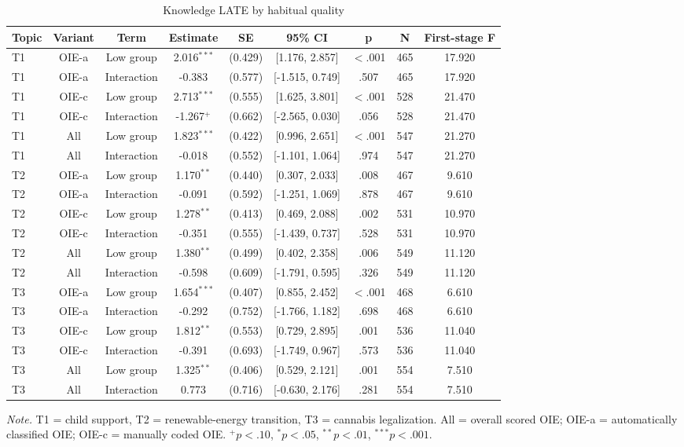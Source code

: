 \begin{table}[htbp]
\centering
\begin{threeparttable}
\caption{Knowledge LATE by habitual quality}
\label{tab:tab_knowledge_moderation}
\begin{tabular}{lcccccccc}
\toprule
  Topic & Variant & Term & Estimate & SE & 95\% CI & p & N & First-stage F \\
\midrule
  T1 & OIE-a & Low group & 2.016$^{***}$ & (0.429) & [1.176, 2.857] & $<$.001 & 465 & 17.920 \\
  T1 & OIE-a & Interaction & -0.383 & (0.577) & [-1.515, 0.749] & .507 & 465 & 17.920 \\
  T1 & OIE-c & Low group & 2.713$^{***}$ & (0.555) & [1.625, 3.801] & $<$.001 & 528 & 21.470 \\
  T1 & OIE-c & Interaction & -1.267$^{+}$ & (0.662) & [-2.565, 0.030] & .056 & 528 & 21.470 \\
  T1 & All & Low group & 1.823$^{***}$ & (0.422) & [0.996, 2.651] & $<$.001 & 547 & 21.270 \\
  T1 & All & Interaction & -0.018 & (0.552) & [-1.101, 1.064] & .974 & 547 & 21.270 \\
  T2 & OIE-a & Low group & 1.170$^{**}$ & (0.440) & [0.307, 2.033] & .008 & 467 & 9.610 \\
  T2 & OIE-a & Interaction & -0.091 & (0.592) & [-1.251, 1.069] & .878 & 467 & 9.610 \\
  T2 & OIE-c & Low group & 1.278$^{**}$ & (0.413) & [0.469, 2.088] & .002 & 531 & 10.970 \\
  T2 & OIE-c & Interaction & -0.351 & (0.555) & [-1.439, 0.737] & .528 & 531 & 10.970 \\
  T2 & All & Low group & 1.380$^{**}$ & (0.499) & [0.402, 2.358] & .006 & 549 & 11.120 \\
  T2 & All & Interaction & -0.598 & (0.609) & [-1.791, 0.595] & .326 & 549 & 11.120 \\
  T3 & OIE-a & Low group & 1.654$^{***}$ & (0.407) & [0.855, 2.452] & $<$.001 & 468 & 6.610 \\
  T3 & OIE-a & Interaction & -0.292 & (0.752) & [-1.766, 1.182] & .698 & 468 & 6.610 \\
  T3 & OIE-c & Low group & 1.812$^{**}$ & (0.553) & [0.729, 2.895] & .001 & 536 & 11.040 \\
  T3 & OIE-c & Interaction & -0.391 & (0.693) & [-1.749, 0.967] & .573 & 536 & 11.040 \\
  T3 & All & Low group & 1.325$^{**}$ & (0.406) & [0.529, 2.121] & .001 & 554 & 7.510 \\
  T3 & All & Interaction & 0.773 & (0.716) & [-0.630, 2.176] & .281 & 554 & 7.510 \\
\bottomrule
\end{tabular}
\begin{tablenotes}\footnotesize\item \textit{Note.} T1 = child support, T2 = renewable-energy transition, T3 = cannabis legalization. All = overall scored OIE; OIE-a = automatically classified OIE; OIE-c = manually coded OIE. $^{+}p<.10$, $^{*}p<.05$, $^{**}p<.01$, $^{***}p<.001$.\end{tablenotes}
\end{threeparttable}
\end{table}
